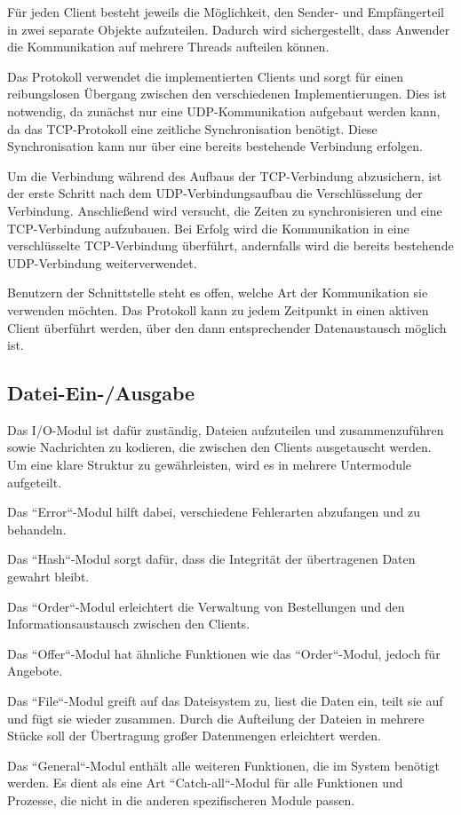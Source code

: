 Für jeden Client besteht jeweils die Möglichkeit, den Sender- und Empfängerteil in zwei separate Objekte aufzuteilen. Dadurch wird sichergestellt, dass Anwender die Kommunikation auf mehrere Threads aufteilen können.

Das Protokoll verwendet die implementierten Clients und sorgt für einen reibungslosen Übergang zwischen den verschiedenen Implementierungen. Dies ist notwendig, da zunächst nur eine UDP-Kommunikation aufgebaut werden kann, da das TCP-Protokoll eine zeitliche Synchronisation benötigt. Diese Synchronisation kann nur über eine bereits bestehende Verbindung erfolgen.

Um die Verbindung während des Aufbaus der TCP-Verbindung abzusichern, ist der erste Schritt nach dem UDP-Verbindungsaufbau die Verschlüsselung der Verbindung. Anschließend wird versucht, die Zeiten zu synchronisieren und eine TCP-Verbindung aufzubauen. Bei Erfolg wird die Kommunikation in eine verschlüsselte TCP-Verbindung überführt, andernfalls wird die bereits bestehende UDP-Verbindung weiterverwendet.

Benutzern der Schnittstelle steht es offen, welche Art der Kommunikation sie verwenden möchten. Das Protokoll kann zu jedem Zeitpunkt in einen aktiven Client überführt werden, über den dann entsprechender Datenaustausch möglich ist.

\subsection{Datei-Ein-/Ausgabe}
Das I/O-Modul ist dafür zuständig, Dateien aufzuteilen und zusammenzuführen sowie Nachrichten zu kodieren, die zwischen den Clients ausgetauscht werden. Um eine klare Struktur zu gewährleisten, wird es in mehrere Untermodule aufgeteilt.

Das “Error“-Modul hilft dabei, verschiedene Fehlerarten abzufangen und zu behandeln.

Das “Hash“-Modul sorgt dafür, dass die Integrität der übertragenen Daten gewahrt bleibt.

Das “Order“-Modul erleichtert die Verwaltung von Bestellungen und den Informationsaustausch zwischen den Clients.

Das “Offer“-Modul hat ähnliche Funktionen wie das “Order“-Modul, jedoch für Angebote.

Das “File“-Modul greift auf das Dateisystem zu, liest die Daten ein, teilt sie auf und fügt sie wieder zusammen. Durch die Aufteilung der Dateien in mehrere Stücke soll der Übertragung großer Datenmengen erleichtert werden.

Das “General“-Modul enthält alle weiteren Funktionen, die im System benötigt werden. Es dient als eine Art “Catch-all“-Modul für alle Funktionen und Prozesse, die nicht in die anderen spezifischeren Module passen.
